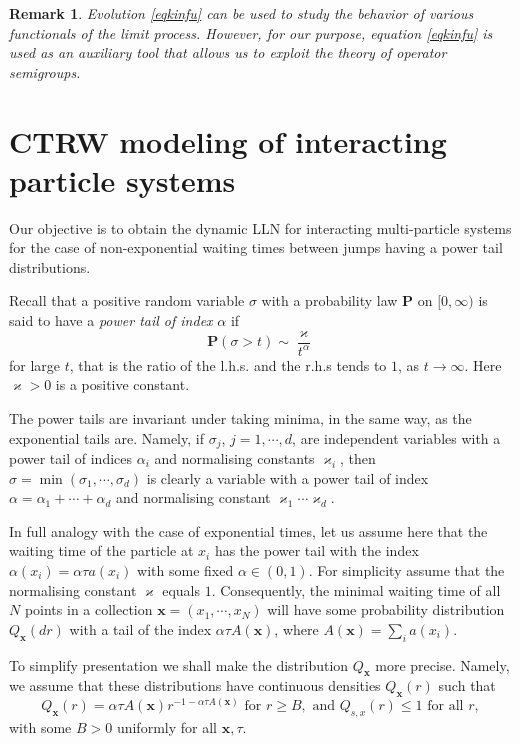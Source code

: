 \documentclass[12pt]{article}
\def\P{\mathbf{P}}
\def\x{\mathbf{x}}
\def\al{\alpha}
\def\ka{\varkappa}
\newcommand{\si}{\sigma}
\numberwithin{equation}{section}
\newtheorem{remark}{Remark}
\begin{document}
\begin{remark}
Evolution \eqref{eqkinfu} can be used to study the behavior of various functionals of the limit process. However, for our purpose, equation \eqref{eqkinfu} is used as an auxiliary tool that allows us to exploit the theory of operator semigroups.
\end{remark}

\section{CTRW modeling of interacting particle systems}
\label{CTRWmodeling}

Our objective is to obtain the dynamic LLN
for interacting multi-particle systems for the case of non-exponential
waiting times between jumps having a power tail distributions.

Recall that a positive random variable $\si$ with a probability law $\P$ on $[0,\infty)$
is said to have a {\it power tail of index} $\al$ if
\[
\P(\si > t) \sim  \frac{\ka}{t^{\al}}
\]
for large $t$, that is the ratio of the l.h.s. and the r.h.s tends to $1$, as $t \to \infty$.
Here $\ka>0$ is a positive constant.

The power tails are invariant under taking minima,
in the same way, as the exponential tails are. Namely, if
$\si_j$, $j=1, \cdots ,d$, are independent variables with a power tail of indices $\al_i$
and normalising constants $\ka_i$,
then $\si=\min(\si_1, \cdots, \si_d)$ is clearly a variable with a power tail of index
$\al=\al_1+ \cdots + \al_d$ and normalising constant $\ka_1\cdots \ka_d$.

In full analogy with the case of exponential times,
 let us assume here that the waiting time of the particle at $x_i$
has the power tail with the index $\al(x_i)=\al \tau a(x_i)$ with some fixed $\al \in (0,1)$.
For simplicity assume that the normalising constant $\ka$ equals $1$. Consequently,
the minimal waiting time of all $N$ points in a collection $\x=(x_1, \cdots, x_N)$
will have some probability distribution $Q_{\x}(dr)$ with a tail of the index $\al \tau A(\x)$,
where $A(\x)=\sum_i a(x_i)$.

To simplify presentation we shall make the distribution $Q_{\x}$ more precise. Namely, we assume
that these distributions have continuous densities $Q_{\x}(r)$ such that
\begin{equation}
\label{eqpowertail1}
Q_{\x}(r)=\al \tau A(\x) r^{-1-\al \tau A(\x)} \,\, \text{for}
\,\, r\ge B, \,\, \text{and} \,\, Q_{s,x}(r) \le 1 \,\, \text{for all} \,\, r,
\end{equation}
with some $B>0$ uniformly for all $\x, \tau$.
\end{document}
